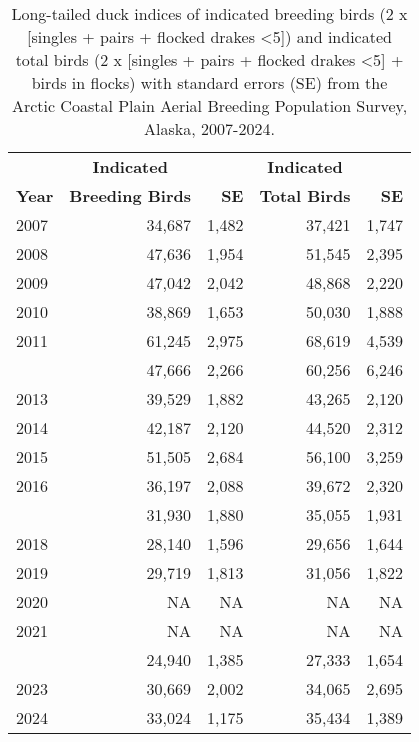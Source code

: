 \documentclass[
]{article}
\begin{document}
\begingroup\fontsize{10}{12}\selectfont

\begin{longtable}[t]{lrrrr}

\caption{\label{tbl-LTDU}Long-tailed duck indices of indicated breeding
birds (2 x {[}singles + pairs + flocked drakes \textless5{]}) and
indicated total birds (2 x {[}singles + pairs + flocked drakes
\textless5{]} + birds in flocks) with standard errors (SE) from the
Arctic Coastal Plain Aerial Breeding Population Survey, Alaska,
2007-2024.}

\tabularnewline

\\
\toprule
\multicolumn{1}{c}{\textbf{ }} & \multicolumn{1}{c}{\textbf{Indicated}} & \multicolumn{1}{c}{\textbf{ }} & \multicolumn{1}{c}{\textbf{Indicated}} & \multicolumn{1}{c}{\textbf{ }} \\
\cmidrule(l{3pt}r{3pt}){2-2} \cmidrule(l{3pt}r{3pt}){4-4}
\textbf{Year} & \textbf{Breeding Birds} & \textbf{SE} & \textbf{Total Birds} & \textbf{SE}\\
\midrule
2007 & 34,687 & 1,482 & 37,421 & 1,747\\
2008 & 47,636 & 1,954 & 51,545 & 2,395\\
2009 & 47,042 & 2,042 & 48,868 & 2,220\\
2010 & 38,869 & 1,653 & 50,030 & 1,888\\
2011 & 61,245 & 2,975 & 68,619 & 4,539\\
\addlinespace
2012 & 47,666 & 2,266 & 60,256 & 6,246\\
2013 & 39,529 & 1,882 & 43,265 & 2,120\\
2014 & 42,187 & 2,120 & 44,520 & 2,312\\
2015 & 51,505 & 2,684 & 56,100 & 3,259\\
2016 & 36,197 & 2,088 & 39,672 & 2,320\\
\addlinespace
2017 & 31,930 & 1,880 & 35,055 & 1,931\\
2018 & 28,140 & 1,596 & 29,656 & 1,644\\
2019 & 29,719 & 1,813 & 31,056 & 1,822\\
2020 & NA & NA & NA & NA\\
2021 & NA & NA & NA & NA\\
\addlinespace
2022 & 24,940 & 1,385 & 27,333 & 1,654\\
2023 & 30,669 & 2,002 & 34,065 & 2,695\\
2024 & 33,024 & 1,175 & 35,434 & 1,389\\
\bottomrule

\end{longtable}
\end{document}
